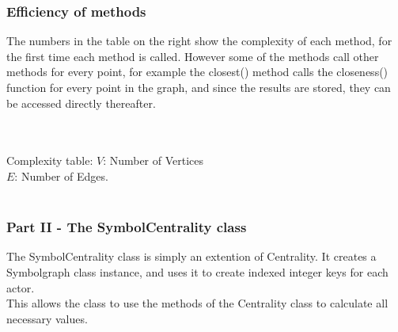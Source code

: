 \documentclass[11pt]{article}
\begin{document}
\subsubsection*{Efficiency of methods}
\begin{minipage}[b]{0.5\linewidth}
The numbers in the table on the right show the complexity of each method, for the first time each method is called. 
However some of the methods call other methods for every point, for example the closest() method calls the closeness() function for every point in the graph,
and since the results are stored, they can be accessed directly thereafter. \\ \\ 
\end{minipage}
\begin{minipage}[b]{0.5\linewidth}\centering
{}
\small{Complexity table: $V$: Number of Vertices \\$E$: Number of Edges.} \\ \\ 
\end{minipage}

\subsubsection*{Part II - The SymbolCentrality class}
The SymbolCentrality class is simply an extention of Centrality. It creates a Symbolgraph class instance, and uses it to create indexed integer keys for each actor.\\
This allows the class to use the methods of the Centrality class to calculate all necessary values.
\end{document}
